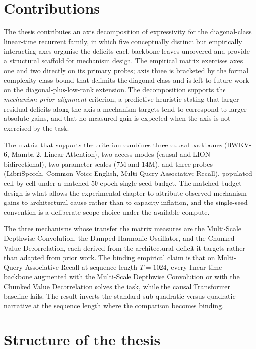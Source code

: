 \section{Contributions}

The thesis contributes an axis decomposition of expressivity for the
diagonal-class linear-time recurrent family, in which five
conceptually distinct but empirically interacting axes organise the
deficits each backbone leaves uncovered and provide a structural
scaffold for mechanism design. The empirical matrix exercises axes
one and two directly on its primary probes; axis three is bracketed
by the formal complexity-class bound that delimits the diagonal
class and is left to future work on the diagonal-plus-low-rank
extension. The decomposition supports the
\textit{mechanism-prior alignment} criterion, a predictive heuristic
stating that larger residual deficits along the axis a mechanism
targets tend to correspond to larger absolute gains, and that no
measured gain is expected when the axis is not exercised by the task.

The matrix that supports the criterion combines three causal
backbones (RWKV-6, Mamba-2, Linear Attention), two access modes
(causal and LION bidirectional), two parameter scales (7M and 14M),
and three probes (LibriSpeech, Common Voice English, Multi-Query
Associative Recall), populated cell by cell under a matched
50-epoch single-seed budget. The matched-budget design is what
allows the experimental chapter to attribute observed mechanism
gains to architectural cause rather than to capacity inflation, and
the single-seed convention is a deliberate scope choice under the
available compute.

The three mechanisms whose transfer the matrix measures are the
Multi-Scale Depthwise Convolution, the Damped Harmonic Oscillator,
and the Chunked Value Decorrelation, each derived from the
architectural deficit it targets rather than adapted from prior
work. The binding empirical claim is that on Multi-Query
Associative Recall at sequence length $T = 1024$, every linear-time
backbone augmented with the Multi-Scale Depthwise Convolution or
with the Chunked Value Decorrelation solves the task, while the
causal Transformer baseline fails. The result inverts the standard
sub-quadratic-versus-quadratic narrative at the sequence length
where the comparison becomes binding.

\section{Structure of the thesis}\label{sec:intro:structure}

